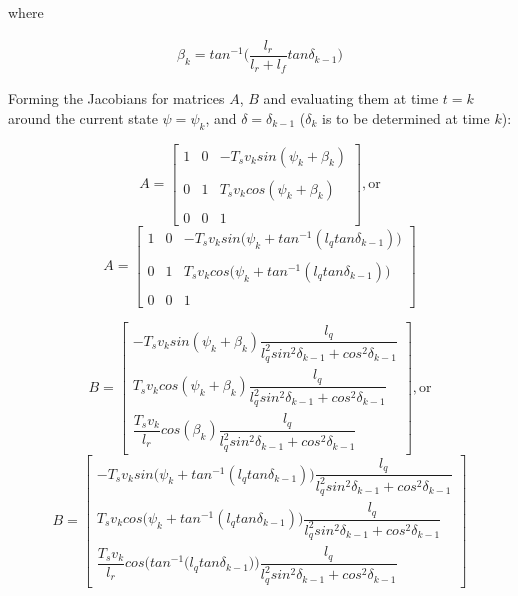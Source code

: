 where

\begin{align}
  \beta_k = tan^{-1}\Big(\dfrac{l_r}{l_r + l_f} tan\delta_{k-1}\Big)
\end{align}


Forming the Jacobians for matrices $A$, $B$ and evaluating them at time
$t=k$ around the current state $\psi = \psi_k$, and
$\delta = \delta_{k-1}$ ($\delta_k$ is to be determined at time $k$):

\begin{equation}
 A =
  \begin{bmatrix}
    1 & 0 & -T_s v_k sin(\psi_k + \beta_k) \\\\
    0 & 1 & T_s v_k cos(\psi_k + \beta_k) \\\\
    0 & 0 & 1
  \end{bmatrix}, \text{or}
\end{equation}
\begin{equation}
  A =
  \begin{bmatrix}
    1 & 0 & -T_s v_k sin\Big(\psi_k + tan^{-1} (l_q tan\delta_{k-1})\Big) \\\\
    0 & 1 & T_s v_k cos\Big(\psi_k + tan^{-1} (l_q tan\delta_{k-1})\Big) \\\\
    0 & 0 & 1
  \end{bmatrix}
\end{equation}


\begin{equation}
 B =
  \begin{bmatrix}
    -T_s v_k sin(\psi_k + \beta_k) \dfrac{l_q}{l_q^2 sin^2\delta_{k-1} + cos^2\delta_{k-1}} \\
    T_s v_k cos(\psi_k + \beta_k) \dfrac{l_q}{l_q^2 sin^2\delta_{k-1} + cos^2\delta_{k-1}} \\
    \dfrac{T_s v_k}{l_r} cos(\beta_k) \dfrac{l_q}{l_q^2 sin^2\delta_{k-1} + cos^2\delta_{k-1}}
  \end{bmatrix}, \text{or}
\end{equation}
\begin{equation}
  B =
  \begin{bmatrix}
    -T_s v_k sin\Big(\psi_k + tan^{-1} (l_q tan\delta_{k-1})\Big) \dfrac{l_q}{l_q^2 sin^2\delta_{k-1} + cos^2\delta_{k-1}} \\
    T_s v_k cos\Big(\psi_k + tan^{-1} (l_q tan\delta_{k-1})\Big) \dfrac{l_q}{l_q^2 sin^2\delta_{k-1} + cos^2\delta_{k-1}} \\
    \dfrac{T_s v_k}{l_r} cos\Bigg(tan^{-1} \Big(l_q tan\delta_{k-1}\Big)\Bigg) \dfrac{l_q}{l_q^2 sin^2\delta_{k-1} + cos^2\delta_{k-1}}
  \end{bmatrix}
\end{equation}


